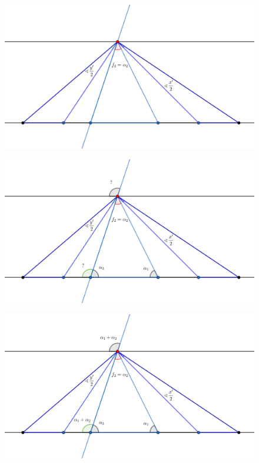 {\begin{frame}
  \begin{figure}
    \centering
    \includegraphics[width=.65 \paperwidth]{./images/D3.png}
  \end{figure}
\end{frame}

\begin{frame}
  \begin{figure}
    \centering
    \includegraphics[width=.65 \paperwidth]{./images/D4.png}
  \end{figure}
\end{frame}

\begin{frame}
  \begin{figure}
    \centering
    \includegraphics[width=.65 \paperwidth]{./images/D5.png}
  \end{figure}
\end{frame}

}
